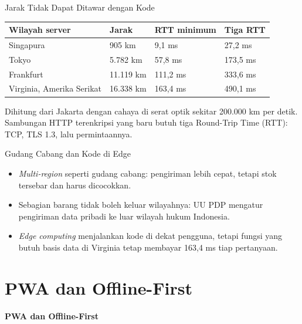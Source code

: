 \documentclass[aspectratio=169, table, 12pt]{beamer}
\begin{document}
\begin{frame}{{\Large Jarak Tidak Dapat Ditawar dengan Kode}}
  \vspace{6pt}
  \centering
  {\footnotesize
  \begin{tabularx}{\textwidth}{Ylll}
    \hline
    \textbf{Wilayah server} & \textbf{Jarak} & \textbf{RTT minimum} & \textbf{Tiga RTT} \\
    \hline
    Singapura & 905 km & 9,1 ms & 27,2 ms \\
    \hline
    Tokyo & 5.782 km & 57,8 ms & 173,5 ms \\
    \hline
    Frankfurt & 11.119 km & 111,2 ms & 333,6 ms \\
    \hline
    Virginia, Amerika Serikat & 16.338 km & 163,4 ms & 490,1 ms \\
    \hline
  \end{tabularx}}

  \vspace{6pt}
  {\small Dihitung dari Jakarta dengan cahaya di serat optik sekitar 200.000
  km per detik. Sambungan HTTP terenkripsi yang baru butuh tiga Round-Trip
  Time (RTT): TCP, TLS 1.3, lalu permintaannya.}
\end{frame}

\begin{frame}{{\Large Gudang Cabang dan Kode di Edge}}
  \vspace{12pt}
  \begin{itemize}
    \item \textit{Multi-region} seperti gudang cabang: pengiriman lebih
          cepat, tetapi stok tersebar dan harus dicocokkan.
    \item Sebagian barang tidak boleh keluar wilayahnya: UU PDP mengatur
          pengiriman data pribadi ke luar wilayah hukum Indonesia.
    \item \textit{Edge computing} menjalankan kode di dekat pengguna, tetapi
          fungsi yang butuh basis data di Virginia tetap membayar 163,4 ms
          tiap pertanyaan.
  \end{itemize}
\end{frame}

\section{PWA dan Offline-First}

\begin{frame}{\hfill}
  \centering
  \Huge{\textbf{PWA dan Offline-First}}
\end{frame}
\end{document}
